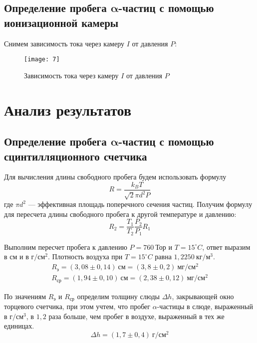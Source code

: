 \documentclass[a4paper, 12pt]{article}
\begin{document}
\subsection*{Определение пробега $\symbf{\alpha}$-частиц с помощью
ионизационной камеры}
Снимем зависимость тока через камеру $I$ от давления $P$:

\begin{figure}[H]
    \texttt{[image: 7]} 
    \caption{Зависимость тока через камеру $I$ от давления $P$}
    \label{fig:7}
\end{figure}




\section{Анализ результатов}
\subsection*{Определение пробега $\symbf{\alpha}$-частиц с помощью
сцинтилляционного счетчика}
Для вычисления длины свободного пробега будем использовать формулу
\begin{equation}
    R = \frac{k_B T}{\sqrt{2}\pi d^2 P}
    \label{eq:2}
\end{equation}
где $\pi d^2$ --- эффективная площадь поперечного сечения частиц.
Получим формулу для пересчета длины свободного пробега к другой
температуре и давлению:
\begin{equation}
    R_2 = \frac{T_1}{T_2} \frac{P_2}{P_1} R_1
    \label{eq:3}
\end{equation}

Выполним пересчет пробега к давлению $P = 760\: \text{Тор}$ и $T =
15^\circ C$, ответ выразим в см и в $\text{г}/\text{см}^2$. Плотность
воздуха при $T = 15^\circ C$ равна $1,2250\: \text{кг}/\text{м}^3$.
\begin{equation*}
    \begin{gathered}
        R_\text{э} =  (3,08 \pm 0,14)\: \text{см} = (3,8 \pm 0,2)\:
         \text{мг}/\text{см}^2\\
        R_\text{ср} =  (1,94 \pm 0,10)\: \text{см} = (2,38 \pm 0,12)\:
         \text{мг}/\text{см}^2
    \end{gathered}
\end{equation*}

По значениям $R_\text{э}$ и $R_\text{ср}$ определим толщину слюды
$\Delta h$,
закрывающей окно торцевого счетчика, при этом учтем, что пробег
$\alpha$-частицы в слюде, выраженный в $\text{г}/\text{см}^3$, в $1,2$
раза больше, чем пробег в воздухе, выраженный в тех же единицах.
\[
    \Delta h = (1,7 \pm 0,4)\: \text{г}/\text{см}^2
\]
\end{document}
